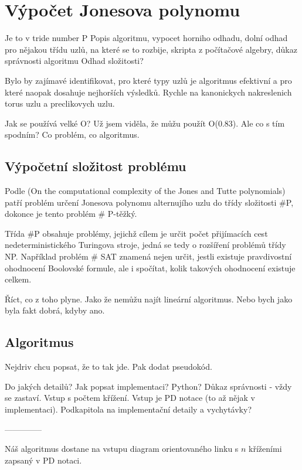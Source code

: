 \chapter{Výpočet Jonesova polynomu}


Je to v tride number P  
Popis algoritmu, vypocet horniho odhadu, dolní odhad pro nějakou třídu uzlů, na které se to rozbije, skripta z počítačové algebry, důkaz správnosti algoritmu
Odhad složitosti?


Bylo by zajímavé identifikovat, pro které typy uzlů je algoritmus efektivní a pro které naopak dosahuje nejhorších výsledků.
Rychle na kanonickych nakreslenich torus uzlu a preclikovych uzlu.

Jak se používá velké O?
Už jsem viděla, že můžu použít O(0.83). Ale co s tím spodním?
Co problém, co algoritmus.

\section{Výpočetní složitost problému}

Podle (On the computational complexity of the Jones and Tutte polynomials) patří problém určení Jonesova polynomu alternujího uzlu do třídy složitosti \#P, dokonce je tento problém \# P-těžký. 

Třída \#P obsahuje problémy, jejichž cílem je určit počet přijímacích cest nedeterministického Turingova stroje, jedná se tedy o rozšíření problémů třídy NP. Například problém \# SAT znamená nejen určit, jestli existuje pravdivostní ohodnocení Boolovské formule, ale i spočítat, kolik takových ohodnocení existuje celkem.

Říct, co z toho plyne. Jako že nemůžu najít lineární algoritmus. Nebo bych jako byla fakt dobrá, kdyby ano.

\section{Algoritmus}
Nejdriv chcu popsat, že to tak jde. Pak dodat pseudokód.

Do jakých detailů? Jak popsat implementaci? Python? Důkaz správnosti - vždy se zastaví. Vstup s počtem křížení. Vstup je PD notace (to až nějak v implementaci).
Podkapitola na implementační detaily a vychytávky?

--------------

Náš algoritmus dostane na vstupu diagram orientovaného linku s $n$ kříženími zapsaný v PD notaci.

